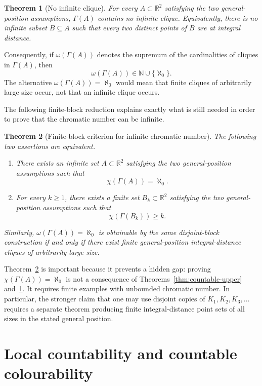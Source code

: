 \documentclass[11pt,a4paper]{amsart}
\newtheorem{theorem}{Theorem}[section]
\theoremstyle{definition}
\newcommand{\R}{\mathbb{R}}
\newcommand{\N}{\mathbb{N}}
\begin{document}
\begin{theorem}[No infinite clique]\label{thm:no-infinite-clique}
For every $A\subset \R^2$ satisfying the two general-position assumptions, $\Gamma(A)$ contains no infinite clique.  Equivalently, there is no infinite subset $B\subseteq A$ such that every two distinct points of $B$ are at integral distance.
\end{theorem}

Consequently, if $\omega(\Gamma(A))$ denotes the supremum of the cardinalities of cliques in $\Gamma(A)$, then
\[
        \omega(\Gamma(A))\in \N\cup\{\aleph_0\}.
\]
The alternative $\omega(\Gamma(A))=\aleph_0$ would mean that finite cliques of arbitrarily large size occur, not that an infinite clique occurs.

The following finite-block reduction explains exactly what is still needed in order to prove that the chromatic number can be infinite.

\begin{theorem}[Finite-block criterion for infinite chromatic number]\label{thm:finite-block}
The following two assertions are equivalent.
\begin{enumerate}[label=(\alph*)]
    \item There exists an infinite set $A\subset \R^2$ satisfying the two general-position assumptions such that
    \[
        \chi(\Gamma(A))=\aleph_0.
    \]
    \item For every $k\geq 1$, there exists a finite set $B_k\subset \R^2$ satisfying the two general-position assumptions such that
    \[
        \chi(\Gamma(B_k))\geq k.
    \]
\end{enumerate}
Similarly, $\omega(\Gamma(A))=\aleph_0$ is obtainable by the same disjoint-block construction if and only if there exist finite general-position integral-distance cliques of arbitrarily large size.
\end{theorem}

Theorem~\ref{thm:finite-block} is important because it prevents a hidden gap: proving $\chi(\Gamma(A))=\aleph_0$ is not a consequence of Theorems~\ref{thm:countable-upper} and~\ref{thm:no-infinite-clique}.  It requires finite examples with unbounded chromatic number.  In particular, the stronger claim that one may use disjoint copies of $K_1,K_2,K_3,\ldots$ requires a separate theorem producing finite integral-distance point sets of all sizes in the stated general position.

\section{Local countability and countable colourability}
\end{document}
